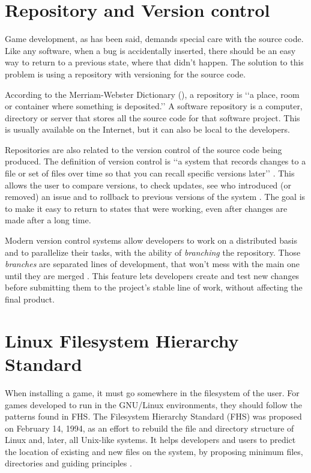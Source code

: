 

\section{Repository and Version control}
\label {sec:repository}

Game development, as has been said, demands special care with the source code. Like any software, when a bug is accidentally inserted, there should be an easy way to return to a previous state, where that didn't happen. The solution to this problem is using a repository with versioning for the source code.

According to the Merriam-Webster Dictionary (\citeyear{webster2017repository}), a repository is \lq\lq a place, room or container where something is deposited.\rq\rq{} A software repository is a computer, directory or server that stores all the source code for that software project. This is usually available on the Internet, but it can also be local to the developers.

Repositories are also related to the version control of the source code being produced. The definition of version control is \lq\lq a system that records changes to a file or set of files over time so that you can recall specific versions later\rq\rq{} \cite{loeliger2012version}. This allows the user to compare versions, to check updates, see who introduced (or removed) an issue and to rollback to previous versions of the system \cite{chacon2014pro}. The goal is to make it easy to return to states that were working, even after changes are made after a long time.

Modern version control systems allow developers to work on a distributed basis and to parallelize their tasks, with the ability of \textit{branching} the repository. Those \textit{branches} are separated lines of development, that won't mess with the main one until they are merged \cite{westby2015git}. This feature lets developers create and test new changes before submitting them to the project's stable line of work, without affecting the final product.




\section{Linux Filesystem Hierarchy Standard}
\label {sec:fhs}

When installing a game, it must go somewhere in the filesystem of the user. For games developed to run in the GNU/Linux environments, they should follow the patterns found in FHS. The Filesystem Hierarchy Standard (FHS) was proposed on February 14, 1994, as an effort to rebuild the file and directory structure of Linux and, later, all Unix-like systems. It helps developers and users to predict the location of existing and new files on the system, by proposing minimum files, directories and guiding principles \cite{bandel2001special}.

